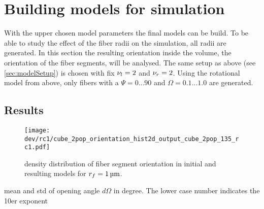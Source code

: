 \section{Building models for simulation}
% 
With the upper chosen model parameters the final models can be build.
To be able to study the effect of the fiber radii on the simulation, all radii are generated.
In this section the resulting orientation inside the volume, \ie{} the orientation of the fiber segments, will be analysed.
The same setup as above (see \cref{sec:modelSetup}) is chosen with fix $\textnormal{$\nu_{l}$}=\SI{2}{}$ and $\textnormal{$\nu_{r}$} = \SI{2}{}$.
Using the rotational model from above, only fibers with a $\Psi =  0...90$ and $\Omega = 0.1...1.0$ are generated.
% 
% 
% 
\subsection{Results}
% 
\begin{figure}[!t]
\centering
\texttt{[image: dev/rc1/cube\_2pop\_orientation\_hist2d\_output\_cube\_2pop\_135\_rc1.pdf]}
\caption[Model orientation histograms]{density distribution of fiber segment orientation in initial and resulting models for $\fiberRadius = \SI{1}{\micro\meter}$.  }
\label{fig:modelOrientation}
\end{figure}
% 
\begin{table}[!b]
\centering
{}
\caption[repo angle results]{mean and std of opening angle $d\Omega$ in degree. The lower case number indicates the 10er exponent}
\end{table}
% 
